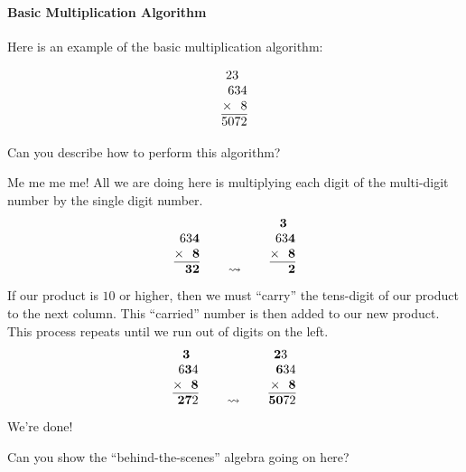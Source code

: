 \paragraph{Basic Multiplication Algorithm}
Here is an example of the basic multiplication algorithm:

\[
\begin{array}{@{}r@{}}
23~~\\
634\\
\times~~8\\ \hline
5072
\end{array}
\]

\begin{question}
Can you describe how to perform this algorithm?
\end{question}

Me me me me! All we are doing here is multiplying each digit of the
multi-digit number by the single digit number.
\[
\begin{array}[b]{@{}r@{}}
63\textbf{4}\\
\times~~\textbf{8}\\ \hline
~~\textbf{32}
\end{array}
\qquad
\leadsto
\qquad
\begin{array}[b]{@{}r@{}}
\textbf{3}~~\\
63\textbf{4}\\
\times~~\textbf{8}\\ \hline
~~~\textbf{2}
\end{array}
\]
If our product is $10$ or higher, then we must ``carry'' the
tens-digit of our product to the next column. This ``carried'' number
is then added to our new product. This process repeats until we run
out of digits on the left.
\[
\begin{array}[b]{@{}r@{}}
\textbf{3}~~\\
6\textbf{3}4\\
\times~~\textbf{8}\\ \hline
~\textbf{27}2
\end{array}
\qquad
\leadsto
\qquad
\begin{array}[b]{@{}r@{}}
\textbf{2}3~~\\
\textbf{6}34\\
\times~~\textbf{8}\\ \hline
\textbf{50}72
\end{array}
\]
We're done!

\begin{question}
Can you show the ``behind-the-scenes'' algebra going on here?
\end{question}

